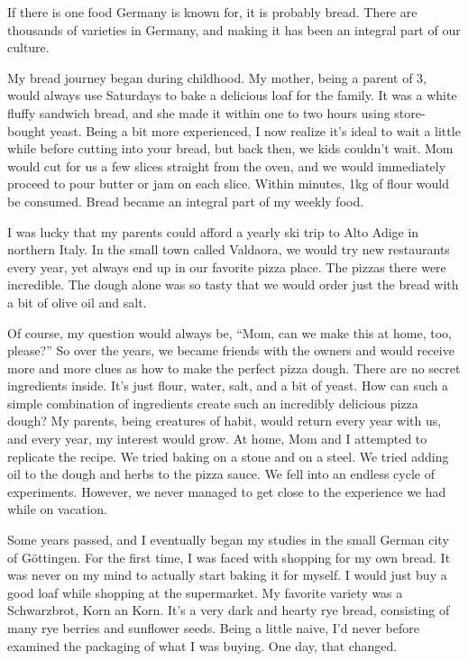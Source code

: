 If there is one food Germany is known for, it is probably bread.
There are thousands of varieties in Germany,
and making it has been an integral part of our culture.

My bread journey began during childhood. My mother, being a parent
of 3, would always use Saturdays to bake a delicious loaf for the family.
It was a white fluffy sandwich bread, and she made it within one to two hours using store-bought yeast.
Being a bit more experienced, I now realize it's
ideal to wait a little while before cutting into your bread, but back then,
we kids couldn't wait. Mom would cut for us a few slices straight from the oven, and we would
immediately proceed to pour butter or jam on each slice. Within minutes, 1kg of
flour would be consumed. Bread became an integral part of my weekly food.

I was lucky that my parents could afford a yearly ski trip to
Alto Adige in northern Italy. In the small town called Valdaora, we
would try new restaurants every year, yet always end up in our favorite
pizza place. The pizzas there were incredible. The dough
alone was so tasty that we would order just the bread with a
bit of olive oil and salt.

Of course, my question would always be, ``Mom, can we make this at home, too, please?''
So over the years, we became friends with the owners and would receive
more and more clues as how to make the perfect pizza dough. There
are no secret ingredients inside. It's just flour, water, salt, and a bit of yeast.
How can such a simple combination of ingredients create such an incredibly delicious
pizza dough? My parents, being creatures of habit, would return every year with us,
and every year, my interest would grow. At home, Mom and I attempted to replicate
the recipe. We tried baking on a stone and on a steel. We tried adding oil to the dough and herbs
to the pizza sauce. We fell into an endless cycle of experiments. However, we never managed
to get close to the experience we had while on vacation.

Some years passed, and I eventually began my studies in the small German city of Göttingen.
For the first time, I was faced with shopping for my own bread. It was never
on my mind to actually start baking it for myself. I would just buy 
a good loaf while shopping at the supermarket. My favorite variety
was a Schwarzbrot, Korn an Korn. It's a very dark and hearty rye bread,
consisting of many rye berries and sunflower seeds. Being a little naive,
I'd never before examined the packaging of what I was buying. One day, that
changed.


